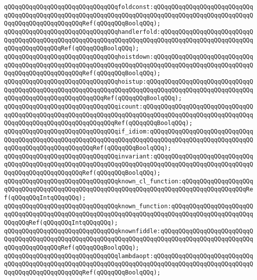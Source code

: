 \verb|qQQqqQQqqQQqqQQqqQQqqQQqqQQqqQQqfoldconst:qQQqqQQqqQQqqQQqqQQqqQQqqQQqqQQqqQQqqQQqqQQqqQQqqQQqqQQqqQQqqQQqqQQqqQQqqQQqqQQqqQQqqQQqqQQqqQQqqQQqqQQqqQQqqQQqqQQqqQQqRef(qQQqqQQqBoolqQQq);|\newline
\verb|qQQqqQQqqQQqqQQqqQQqqQQqqQQqqQQqhandlerfold:qQQqqQQqqQQqqQQqqQQqqQQqqQQqqQQqqQQqqQQqqQQqqQQqqQQqqQQqqQQqqQQqqQQqqQQqqQQqqQQqqQQqqQQqqQQqqQQqqQQqqQQqqQQqqQQqRef(qQQqqQQqBoolqQQq);|\newline
\verb|qQQqqQQqqQQqqQQqqQQqqQQqqQQqqQQqhoistdown:qQQqqQQqqQQqqQQqqQQqqQQqqQQqqQQqqQQqqQQqqQQqqQQqqQQqqQQqqQQqqQQqqQQqqQQqqQQqqQQqqQQqqQQqqQQqqQQqqQQqqQQqqQQqqQQqqQQqqQQqRef(qQQqqQQqBoolqQQq);|\newline
\verb|qQQqqQQqqQQqqQQqqQQqqQQqqQQqqQQqhoistup:qQQqqQQqqQQqqQQqqQQqqQQqqQQqqQQqqQQqqQQqqQQqqQQqqQQqqQQqqQQqqQQqqQQqqQQqqQQqqQQqqQQqqQQqqQQqqQQqqQQqqQQqqQQqqQQqqQQqqQQqqQQqqQQqRef(qQQqqQQqBoolqQQq);|\newline
\verb|qQQqqQQqqQQqqQQqqQQqqQQqqQQqqQQqicount:qQQqqQQqqQQqqQQqqQQqqQQqqQQqqQQqqQQqqQQqqQQqqQQqqQQqqQQqqQQqqQQqqQQqqQQqqQQqqQQqqQQqqQQqqQQqqQQqqQQqqQQqqQQqqQQqqQQqqQQqqQQqqQQqqQQqRef(qQQqqQQqBoolqQQq);|\newline
\verb|qQQqqQQqqQQqqQQqqQQqqQQqqQQqqQQqif_idiom:qQQqqQQqqQQqqQQqqQQqqQQqqQQqqQQqqQQqqQQqqQQqqQQqqQQqqQQqqQQqqQQqqQQqqQQqqQQqqQQqqQQqqQQqqQQqqQQqqQQqqQQqqQQqqQQqqQQqqQQqqQQqRef(qQQqqQQqBoolqQQq);|\newline
\verb|qQQqqQQqqQQqqQQqqQQqqQQqqQQqqQQqinvariant:qQQqqQQqqQQqqQQqqQQqqQQqqQQqqQQqqQQqqQQqqQQqqQQqqQQqqQQqqQQqqQQqqQQqqQQqqQQqqQQqqQQqqQQqqQQqqQQqqQQqqQQqqQQqqQQqqQQqqQQqRef(qQQqqQQqBoolqQQq);|\newline
\newline
\verb|qQQqqQQqqQQqqQQqqQQqqQQqqQQqqQQqknown_cl_function:qQQqqQQqqQQqqQQqqQQqqQQqqQQqqQQqqQQqqQQqqQQqqQQqqQQqqQQqqQQqqQQqqQQqqQQqqQQqqQQqqQQqqQQqRef(qQQqqQQqIntqQQqqQQq);|\newline
\verb|qQQqqQQqqQQqqQQqqQQqqQQqqQQqqQQqknown_function:qQQqqQQqqQQqqQQqqQQqqQQqqQQqqQQqqQQqqQQqqQQqqQQqqQQqqQQqqQQqqQQqqQQqqQQqqQQqqQQqqQQqqQQqqQQqqQQqqQQqRef(qQQqqQQqIntqQQqqQQq);|\newline
\newline
\verb|qQQqqQQqqQQqqQQqqQQqqQQqqQQqqQQqknownfiddle:qQQqqQQqqQQqqQQqqQQqqQQqqQQqqQQqqQQqqQQqqQQqqQQqqQQqqQQqqQQqqQQqqQQqqQQqqQQqqQQqqQQqqQQqqQQqqQQqqQQqqQQqqQQqqQQqRef(qQQqqQQqBoolqQQq);|\newline
\verb|qQQqqQQqqQQqqQQqqQQqqQQqqQQqqQQqlambdaopt:qQQqqQQqqQQqqQQqqQQqqQQqqQQqqQQqqQQqqQQqqQQqqQQqqQQqqQQqqQQqqQQqqQQqqQQqqQQqqQQqqQQqqQQqqQQqqQQqqQQqqQQqqQQqqQQqqQQqqQQqRef(qQQqqQQqBoolqQQq);|\newline
